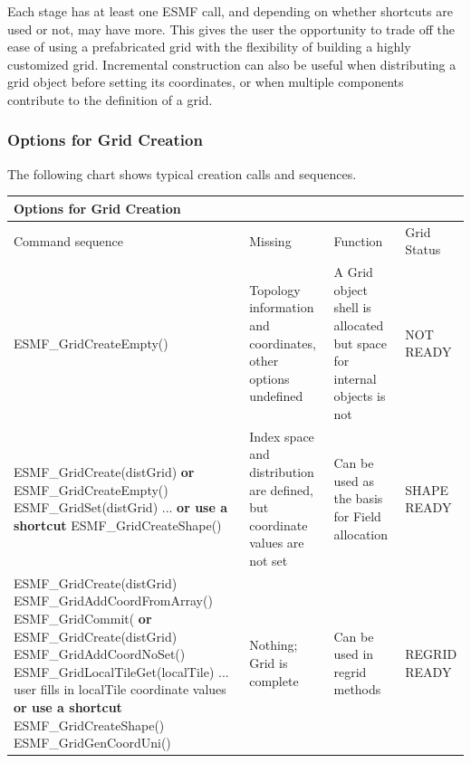 Each stage has at least one ESMF call, and depending on 
whether shortcuts are used or not, may have more.
This gives the user the opportunity to trade off the 
ease of using a prefabricated grid with the flexibility 
of building a highly customized grid.  Incremental
construction can also be useful when distributing a grid object
before setting its coordinates, or when multiple components
contribute to the definition of a grid. 

\subsubsection{Options for Grid Creation}
\label{gridcreateoptions}

The following chart shows typical creation calls and 
sequences.  

\medskip
\begin{tabular}{|p{2.6in}|p{1in}|p{1in}|p{1.4in}|}
\hline
\multicolumn{4}{|l|}{{\bf Options for Grid Creation}} \\
\hline
Command sequence & Missing & Function & Grid Status \\ 
\hline
ESMF\_GridCreateEmpty() 
& Topology information and coordinates, other options undefined
& A Grid object shell is allocated but space for 
internal objects is not
& NOT READY \\
\hline
ESMF\_GridCreate(distGrid)\newline
{\bf or} \newline
ESMF\_GridCreateEmpty()\newline
ESMF\_GridSet(distGrid)\newline
...\newline
{\bf or use a shortcut} \newline
ESMF\_GridCreateShape()\newline
& Index space and distribution are defined, but coordinate 
 values are not set
& Can be used as the basis for Field allocation
& SHAPE READY\\
\hline
ESMF\_GridCreate(distGrid)\newline
ESMF\_GridAddCoordFromArray()\newline
ESMF\_GridCommit(\newline
{\bf or} \newline 
ESMF\_GridCreate(distGrid)\newline
ESMF\_GridAddCoordNoSet()\newline
ESMF\_GridLocalTileGet(localTile)\newline
... user fills in localTile coordinate values
{\bf or use a shortcut} \newline
ESMF\_GridCreateShape()\newline
ESMF\_GridGenCoordUni()\newline
& Nothing; Grid is complete
& Can be used in regrid methods
& REGRID READY\\
\hline
\end{tabular}



 


